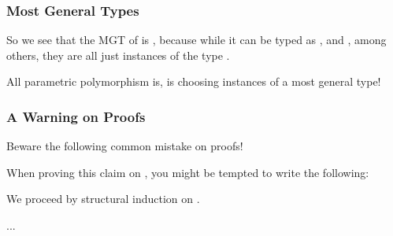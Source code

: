 \documentclass[aspectratio=169, handout]{beamer}
\begin{document}
\begin{frame}[fragile]
  \frametitle{Most General Types}

  So we see that the MGT of  is ,
  because while it can be typed as , and 
  , among others, they are all just instances 
  of the type . 

  \pause
  \vspace{\fill}

  All parametric polymorphism is, is choosing instances of a most general
  type!

  \pause
  \vspace{\fill}

\end{frame}

\begin{frame}[fragile]
  \frametitle{A Warning on Proofs}

  Beware the following common mistake on proofs!

  \pause
  \vspace{\fill}


  \pause
  \vspace{\fill}

  When proving this claim on , you might be tempted to
  write the following:

  \pause
  \vspace{\fill}

  We proceed by structural induction on .

  \vspace{\fill}


  \vspace{\fill}

  ...
\end{frame}
\end{document}
